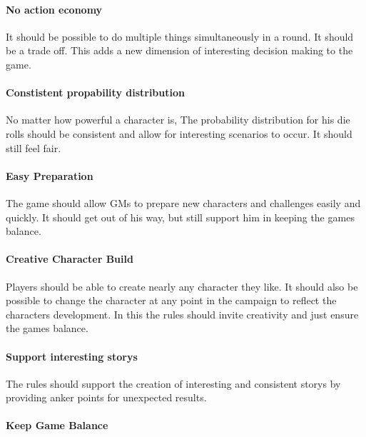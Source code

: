 \documentclass[11pt]{article}
\begin{document}
{\paragraph*{No action economy}
\label{sec:org99447ff}

It should be possible to do multiple things simultaneously in a round. It should be a trade off. This adds a new dimension of interesting decision making to the game.

\paragraph*{Constistent propability distribution}
\label{sec:org72e51cb}

No matter how powerful a character is, The probability distribution for his die rolls should be consistent and allow for interesting scenarios to occur. It should still feel fair.

\paragraph*{Easy Preparation}
\label{sec:org687a885}

The game should allow GMs to prepare new characters and challenges easily and quickly. It should get out of his way, but still support him in keeping the games balance.

\paragraph*{Creative Character Build}
\label{sec:org99f1bbf}

Players should be able to create nearly any character they like. It should also be possible to change the character at any point in the campaign to reflect the characters development. In this the rules should invite creativity and just ensure the games balance.

\paragraph*{Support interesting storys}
\label{sec:orgc82ce94}

The rules should support the creation of interesting and consistent storys by providing anker points for unexpected results.

\paragraph*{Keep Game Balance}
\label{sec:orgb6ac935}

}
\end{document}

